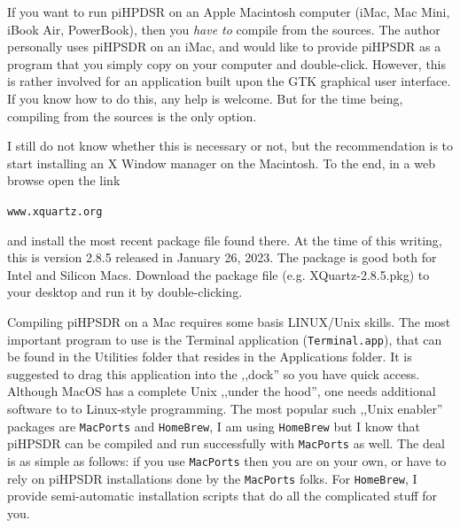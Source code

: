 \documentclass[12pt]{book}
\begin{document}
If you want to run piHPDSR on an Apple Macintosh computer (iMac, Mac Mini, iBook Air, PowerBook), then
you \textit{have to} compile from the sources. The author personally uses piHPSDR on an iMac, and would like
to provide piHPSDR as a program that you simply copy on your computer and double-click. However, this is
rather involved for an application built upon the GTK graphical user interface. If you know how to do this,
any help is welcome. But for the time being, compiling from the sources is the only option.

\begin{center}
\end{center}

I still do not know whether this is necessary or not, but the recommendation is to start installing
an X Window manager on the Macintosh. To the end, in a web browse open the link

\texttt{www.xquartz.org}

and install the most recent package file found there. At the time of this writing, this is version 2.8.5
released in January 26, 2023. The package is good both for Intel and Silicon Macs. Download the package
file (e.g. XQuartz-2.8.5.pkg) to your desktop and run it by double-clicking.


Compiling piHPSDR on a Mac requires some basis LINUX/Unix skills. The most important program to use is
the Terminal application (\texttt{Terminal.app}), that can be found in the Utilities folder that resides
in the Applications folder. It is suggested to drag this application into the ,,dock'' so you have quick
access.
Although MacOS has a complete Unix ,,under the hood'', one needs additional software to to Linux-style
programming. The most popular such ,,Unix enabler'' packages are \texttt{MacPorts} and \texttt{HomeBrew}, I
am using
\texttt{HomeBrew} but I know that piHPSDR can be compiled and run successfully with \texttt{MacPorts}
as well. The deal is as simple as follows: if you use \texttt{MacPorts} then you are on your own, or
have to rely on piHPSDR installations done by the \texttt{MacPorts} folks. For \texttt{HomeBrew},
I provide semi-automatic installation scripts that do all the complicated stuff for you.
\end{document}

